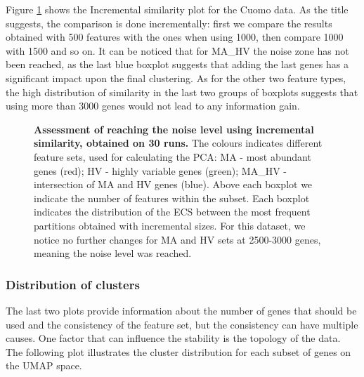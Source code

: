Figure \ref{fig:ca-feat-comp} shows the Incremental similarity plot for the Cuomo data. As the title suggests, the comparison is done incrementally: first we compare the results obtained with 500 features with the ones when using 1000, then compare 1000 with 1500 and so on. It can be noticed that for MA\_HV the noise zone has not been reached, as the last blue boxplot suggests that adding the last genes has a significant impact upon the final clustering. As for the other two feature types, the high distribution of similarity in the last two groups of boxplots suggests that using more than 3000 genes would not lead to any information gain.

\begin{figure}[H]
    \centering
    \caption{\label{fig:ca-feat-comp}\textbf{Assessment of reaching the noise level using incremental similarity, obtained on 30 runs.} The colours indicates different feature sets, used for calculating the PCA: MA - most abundant genes (red); HV - highly variable genes (green); MA\_HV - intersection of MA and HV genes (blue). Above each boxplot we indicate the number of features within the subset. Each boxplot indicates the distribution of the ECS between the most frequent partitions obtained with incremental sizes. For this dataset, we notice no further changes for MA and HV sets at 2500-3000 genes, meaning the noise level was reached.}
\end{figure}

\subsubsection{Distribution of clusters}
The last two plots provide information about the number of genes that should be used and the consistency of the feature set, but the consistency can have multiple causes. One factor that can influence the stability is the topology of the data. The following plot illustrates the cluster distribution for each subset of genes on the UMAP space.

